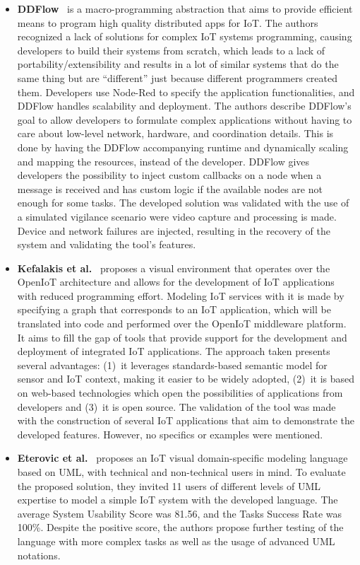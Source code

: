 \begin{itemize}
\item\textbf{DDFlow}~\cite{ddflow} is a macro-programming abstraction that aims to provide efficient means to program high quality distributed apps for IoT. The authors recognized a lack of solutions for complex IoT systems programming, causing developers to build their systems from scratch, which leads to a lack of portability/extensibility and results in a lot of similar systems that do the same thing but are  ``different'' just because different programmers created them. Developers use Node-Red to specify the application functionalities, and DDFlow handles scalability and deployment. The authors describe DDFlow's goal to allow developers to formulate complex applications without having to care about low-level network, hardware, and coordination details. This is done by having the DDFlow accompanying runtime and dynamically scaling and mapping the resources, instead of the developer. DDFlow gives developers the possibility to inject custom callbacks on a node when a message is received and has custom logic if the available nodes are not enough for some tasks. The developed solution was validated with the use of a simulated vigilance scenario were video capture and processing is made. Device and network failures are injected, resulting in the recovery of the system and validating the tool's features.

\item\textbf{Kefalakis et al.}~\cite{visual_paradigm_iot_solutions_development} proposes a visual environment that operates over the OpenIoT architecture and allows for the development of IoT applications with reduced programming effort. Modeling IoT services with it is made by specifying a graph that corresponds to an IoT application, which will be translated into code and performed over the OpenIoT middleware platform. It aims to fill the gap of tools that provide support for the development and deployment of integrated IoT applications. The approach taken presents several advantages: (1)~it leverages standards-based semantic model for sensor and IoT context, making it easier to be widely adopted, (2)~it is based on web-based technologies which open the possibilities of applications from developers and (3)~it is open source. The validation of the tool was made with the construction of several IoT applications that aim to demonstrate the developed features. However, no specifics or examples were mentioned.

\item\textbf{Eterovic et al.}~\cite{vpl_uml} proposes an IoT visual domain-specific modeling language based on UML, with technical and non-technical users in mind. To evaluate the proposed solution, they invited 11 users of different levels of UML expertise to model a simple IoT system with the developed language. The average System Usability Score was 81.56, and the Tasks Success Rate was 100\%. Despite the positive score, the authors propose further testing of the language with more complex tasks as well as the usage of advanced UML notations.


\end{itemize}
